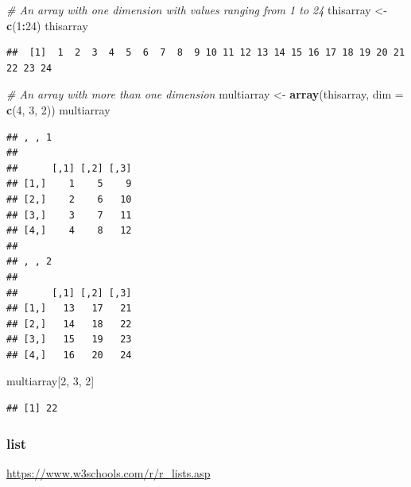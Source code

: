 \documentclass[
]{book}
\newenvironment{Shaded}{\begin{snugshade}}{\end{snugshade}}
\newcommand{\AttributeTok}[1]{\textcolor[rgb]{0.13,0.29,0.53}{#1}}
\newcommand{\CommentTok}[1]{\textcolor[rgb]{0.56,0.35,0.01}{\textit{#1}}}
\newcommand{\DecValTok}[1]{\textcolor[rgb]{0.00,0.00,0.81}{#1}}
\newcommand{\FunctionTok}[1]{\textcolor[rgb]{0.13,0.29,0.53}{\textbf{#1}}}
\newcommand{\NormalTok}[1]{#1}
\newcommand{\OtherTok}[1]{\textcolor[rgb]{0.56,0.35,0.01}{#1}}
\newcommand{\SpecialCharTok}[1]{\textcolor[rgb]{0.81,0.36,0.00}{\textbf{#1}}}
\theoremstyle{definition}
\theoremstyle{definition}
\theoremstyle{definition}
\theoremstyle{definition}
\theoremstyle{remark}
\begin{document}
\begin{Shaded}
\begin{Highlighting}[]
\CommentTok{\# An array with one dimension with values ranging from 1 to 24}
\NormalTok{thisarray }\OtherTok{\textless{}{-}} \FunctionTok{c}\NormalTok{(}\DecValTok{1}\SpecialCharTok{:}\DecValTok{24}\NormalTok{)}
\NormalTok{thisarray}
\end{Highlighting}
\end{Shaded}

\begin{verbatim}
##  [1]  1  2  3  4  5  6  7  8  9 10 11 12 13 14 15 16 17 18 19 20 21 22 23 24
\end{verbatim}

\begin{Shaded}
\begin{Highlighting}[]
\CommentTok{\# An array with more than one dimension}
\NormalTok{multiarray }\OtherTok{\textless{}{-}} \FunctionTok{array}\NormalTok{(thisarray, }\AttributeTok{dim =} \FunctionTok{c}\NormalTok{(}\DecValTok{4}\NormalTok{, }\DecValTok{3}\NormalTok{, }\DecValTok{2}\NormalTok{))}
\NormalTok{multiarray}
\end{Highlighting}
\end{Shaded}

\begin{verbatim}
## , , 1
## 
##      [,1] [,2] [,3]
## [1,]    1    5    9
## [2,]    2    6   10
## [3,]    3    7   11
## [4,]    4    8   12
## 
## , , 2
## 
##      [,1] [,2] [,3]
## [1,]   13   17   21
## [2,]   14   18   22
## [3,]   15   19   23
## [4,]   16   20   24
\end{verbatim}

\begin{Shaded}
\begin{Highlighting}[]
\NormalTok{multiarray[}\DecValTok{2}\NormalTok{, }\DecValTok{3}\NormalTok{, }\DecValTok{2}\NormalTok{]}
\end{Highlighting}
\end{Shaded}

\begin{verbatim}
## [1] 22
\end{verbatim}

\hypertarget{list}{%
\subsubsection{list}\label{list}}

\url{https://www.w3schools.com/r/r_lists.asp}
\end{document}
